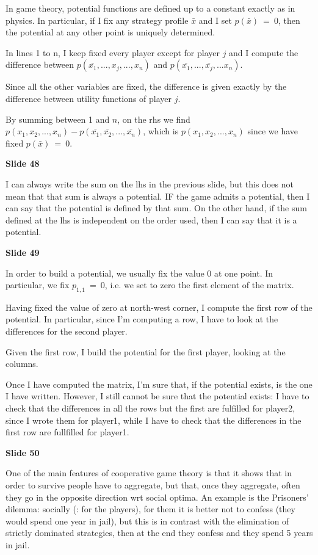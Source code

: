 \noindent In game theory, potential functions are defined up to a constant 
exactly as in physics. In particular, if I fix any strategy profile $\bar{x}$ 
and I set $p(\bar{x})~=~0$, then the potential at any other point is 
uniquely determined.

\noindent In lines 1 to n, I keep fixed every player except for player $j$ 
and I compute the difference between $p(\bar{x_1},...,x_j,...,x_n)$ and 
$p(\bar{x_1},...,\bar{x_j},...x_n)$.

\noindent Since all the other variables are fixed, the difference is given 
exactly by the difference between utility functions of player $j$.

\noindent By summing between 1 and $n$, on the rhs we find 
$p(x_1,x_2,...,x_n)-p(\bar{x_1},\bar{x_2},...,\bar{x_n})$, which is 
$p(x_1,x_2,...,x_n)$ since we have fixed $p(\bar{x})~=~0$.

\bigskip
\noindent \textbf{Slide 48} 

\noindent I can always write the sum on the lhs in the previous slide, but 
this does not mean that that sum is always a potential. IF the game admits 
a potential, then I can say that the potential is defined by that sum. On 
the other hand, if the sum defined at the lhs is independent on the order 
used, then I can say that it is a potential.

\bigskip
\noindent \textbf{Slide 49}

\noindent In order to build a potential, we usually fix the value 0 at one 
point. In particular, we fix $p_{1,1}~=~0$, i.e. we set to zero the first 
element of the matrix.

\noindent Having fixed the value of zero at north-west corner, I compute 
the first row of the potential. In particular, since I'm computing a row, 
I have to look at the differences for the second player.

\noindent Given the first row, I build the potential for the first player, 
looking at the columns.

\noindent Once I have computed the matrix, I'm sure that, if the potential 
exists, is the one I have written. However, I still cannot be sure that the 
potential exists: I have to check that the differences in all the rows but 
the first are fulfilled for player2, since I wrote them for player1, while 
I have to check that the differences in the first row are fullfilled for 
player1.

\bigskip
\noindent \textbf{Slide 50}

\noindent One of the main features of cooperative game theory is that it 
shows that in order to survive people have to aggregate, but that, once they 
aggregate, often they go in the opposite direction wrt social optima. An 
example is the Prisoners' dilemma: socially (: for the players), 
for them it is better not to confess (they would spend one year in jail), 
but this is in contrast with the elimination of strictly dominated strategies, 
then at the end they confess and they spend 5 years in jail.

